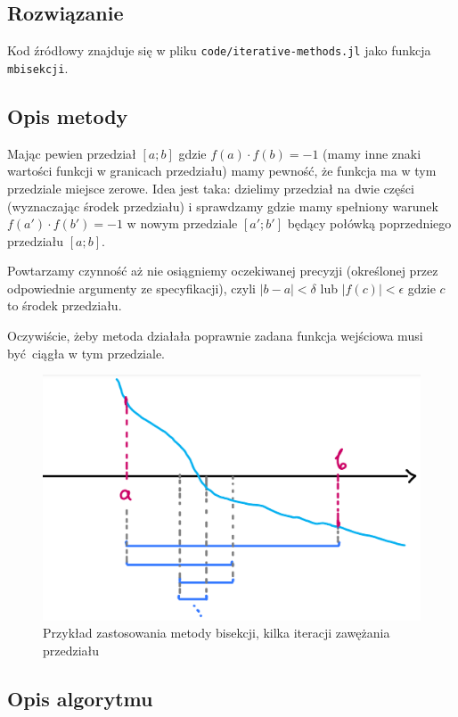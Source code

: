 \documentclass[10pt]{article}
\begin{document}
\subsection{Rozwiązanie}

Kod źródłowy znajduje się w pliku \texttt{code/iterative-methods.jl} jako funkcja \texttt{mbisekcji}.

\subsection{Opis metody}

Mając pewien przedział $[a;b]$ gdzie $f(a) \cdot f(b) = -1$ (mamy inne znaki wartości funkcji w granicach przedziału) mamy pewność, że funkcja ma w tym przedziale miejsce zerowe. Idea jest taka: dzielimy przedział na dwie części (wyznaczając środek przedziału) i sprawdzamy gdzie mamy spełniony warunek $f(a') \cdot f(b') = -1$ w nowym przedziale $[a';b']$ będący połówką poprzedniego przedziału $[a;b]$.

\noindent Powtarzamy czynność aż nie osiągniemy oczekiwanej precyzji (określonej przez odpowiednie argumenty ze specyfikacji), czyli $|b-a| < \delta$ lub $|f(c)| < \epsilon$ gdzie $c$ to środek przedziału.

Oczywiście, żeby metoda działała poprawnie zadana funkcja wejściowa musi być ciągła w tym przedziale.

\begin{figure}[H]
    \centering
    \includegraphics{metoda-bisekcji.png}
    \caption{Przykład zastosowania metody bisekcji, kilka iteracji zawężania przedziału}
\end{figure}

\subsection{Opis algorytmu}
\end{document}
